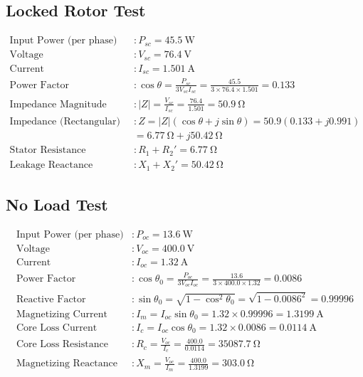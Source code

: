 \documentclass[a4paper,12pt]{article}
\begin{document}
\subsection*{Locked Rotor Test}
\begin{align*}
	\text{Input Power (per phase)} & : P_{sc} = \SI{45.5}{\watt} \\
	\text{Voltage} & : V_{sc} = \SI{76.4}{\volt} \\
	\text{Current} & : I_{sc} = \SI{1.501}{\ampere} \\
	\text{Power Factor} & : \cos\theta = \frac{P_{sc}}{3V_{sc}I_{sc}} = \frac{45.5}{3 \times 76.4 \times 1.501} = 0.133 \\
	\text{Impedance Magnitude} & : |Z| = \frac{V_{sc}}{I_{sc}} = \frac{76.4}{1.501} = \SI{50.9}{\ohm} \\
	\text{Impedance (Rectangular)} & : Z = |Z|(\cos\theta + j\sin\theta) = 50.9(0.133 + j0.991) \\
	& = \SI{6.77}{\ohm} + j\SI{50.42}{\ohm} \\
	\text{Stator Resistance (approx)} & : R_1 + R_2' = \SI{6.77}{\ohm} \\
	\text{Leakage Reactance (approx)} & : X_1 + X_2' = \SI{50.42}{\ohm}
\end{align*}

\subsection*{No Load Test}
\begin{align*}
	\text{Input Power (per phase)} & : P_{oc} = \SI{13.6}{\watt} \\
	\text{Voltage} & : V_{oc} = \SI{400.0}{\volt} \\
	\text{Current} & : I_{oc} = \SI{1.32}{\ampere} \\
	\text{Power Factor} & : \cos\theta_0 = \frac{P_{oc}}{3V_{oc}I_{oc}} = \frac{13.6}{3 \times 400.0 \times 1.32} = 0.0086 \\
	\text{Reactive Factor} & : \sin\theta_0 = \sqrt{1 - \cos^2\theta_0} = \sqrt{1 - 0.0086^2} = 0.99996 \\
	\text{Magnetizing Current} & : I_m = I_{oc}\sin\theta_0 = 1.32 \times 0.99996 = \SI{1.3199}{\ampere} \\
	\text{Core Loss Current} & : I_c = I_{oc}\cos\theta_0 = 1.32 \times 0.0086 = \SI{0.0114}{\ampere} \\
	\text{Core Loss Resistance} & : R_c = \frac{V_{oc}}{I_c} = \frac{400.0}{0.0114} = \SI{35087.7}{\ohm} \\
	\text{Magnetizing Reactance} & : X_m = \frac{V_{oc}}{I_m} = \frac{400.0}{1.3199} = \SI{303.0}{\ohm}
\end{align*}
\end{document}
